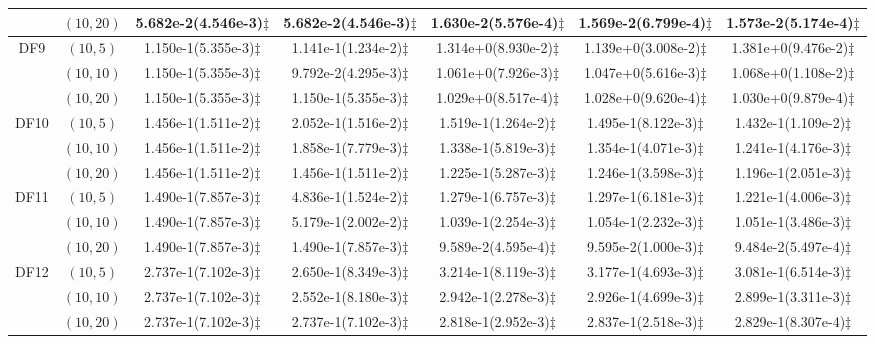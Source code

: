 \documentclass[review]{elsarticle}
\begin{document}
\begin{table*}[!htb]
{\begin{tabular}{ccccccc}
&$(10,20)$ &5.682e-2(4.546e-3)$\ddagger$ &5.682e-2(4.546e-3)$\ddagger$ &1.630e-2(5.576e-4)$\ddagger$ &1.569e-2(6.799e-4)$\ddagger$ &1.573e-2(5.174e-4)$\ddagger$ \\
\hline  \multirow{3}{*}{DF9}
&$(10,5)$ &1.150e-1(5.355e-3)$\ddagger$ &1.141e-1(1.234e-2)$\ddagger$ &1.314e+0(8.930e-2)$\ddagger$ &1.139e+0(3.008e-2)$\ddagger$ &1.381e+0(9.476e-2)$\ddagger$ \\
&$(10,10)$ &1.150e-1(5.355e-3)$\ddagger$ &9.792e-2(4.295e-3)$\ddagger$ &1.061e+0(7.926e-3)$\ddagger$ &1.047e+0(5.616e-3)$\ddagger$ &1.068e+0(1.108e-2)$\ddagger$ \\
&$(10,20)$ &1.150e-1(5.355e-3)$\ddagger$ &1.150e-1(5.355e-3)$\ddagger$ &1.029e+0(8.517e-4)$\ddagger$ &1.028e+0(9.620e-4)$\ddagger$ &1.030e+0(9.879e-4)$\ddagger$ \\
\hline  \multirow{3}{*}{DF10}
&$(10,5)$ &1.456e-1(1.511e-2)$\ddagger$ &2.052e-1(1.516e-2)$\ddagger$ &1.519e-1(1.264e-2)$\ddagger$ &1.495e-1(8.122e-3)$\ddagger$ &1.432e-1(1.109e-2)$\ddagger$ \\
&$(10,10)$ &1.456e-1(1.511e-2)$\ddagger$ &1.858e-1(7.779e-3)$\ddagger$ &1.338e-1(5.819e-3)$\ddagger$ &1.354e-1(4.071e-3)$\ddagger$ &1.241e-1(4.176e-3)$\ddagger$ \\
&$(10,20)$ &1.456e-1(1.511e-2)$\ddagger$ &1.456e-1(1.511e-2)$\ddagger$ &1.225e-1(5.287e-3)$\ddagger$ &1.246e-1(3.598e-3)$\ddagger$ &1.196e-1(2.051e-3)$\ddagger$ \\
\hline  \multirow{3}{*}{DF11}
&$(10,5)$ &1.490e-1(7.857e-3)$\ddagger$ &4.836e-1(1.524e-2)$\ddagger$ &1.279e-1(6.757e-3)$\ddagger$ &1.297e-1(6.181e-3)$\ddagger$ &1.221e-1(4.006e-3)$\ddagger$ \\
&$(10,10)$ &1.490e-1(7.857e-3)$\ddagger$ &5.179e-1(2.002e-2)$\ddagger$ &1.039e-1(2.254e-3)$\ddagger$ &1.054e-1(2.232e-3)$\ddagger$ &1.051e-1(3.486e-3)$\ddagger$ \\
&$(10,20)$ &1.490e-1(7.857e-3)$\ddagger$ &1.490e-1(7.857e-3)$\ddagger$ &9.589e-2(4.595e-4)$\ddagger$ &9.595e-2(1.000e-3)$\ddagger$ &9.484e-2(5.497e-4)$\ddagger$ \\
\hline  \multirow{3}{*}{DF12}
&$(10,5)$ &2.737e-1(7.102e-3)$\ddagger$ &2.650e-1(8.349e-3)$\ddagger$ &3.214e-1(8.119e-3)$\ddagger$ &3.177e-1(4.693e-3)$\ddagger$ &3.081e-1(6.514e-3)$\ddagger$ \\
&$(10,10)$ &2.737e-1(7.102e-3)$\ddagger$ &2.552e-1(8.180e-3)$\ddagger$ &2.942e-1(2.278e-3)$\ddagger$ &2.926e-1(4.699e-3)$\ddagger$ &2.899e-1(3.311e-3)$\ddagger$ \\
&$(10,20)$ &2.737e-1(7.102e-3)$\ddagger$ &2.737e-1(7.102e-3)$\ddagger$ &2.818e-1(2.952e-3)$\ddagger$ &2.837e-1(2.518e-3)$\ddagger$ &2.829e-1(8.307e-4)$\ddagger$ \\

\end{tabular}}
\end{table*}
\end{document}
